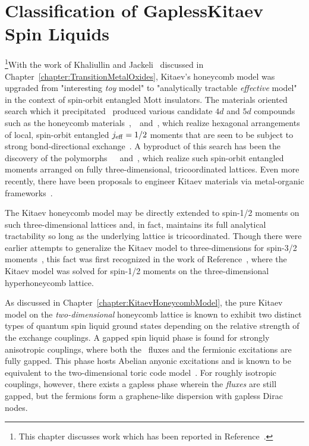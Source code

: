 \chapter[Classification of Gapless Kitaev Spin Liquids]{Classification of Gapless\linebreak Kitaev Spin Liquids}
\label{chapter:ClassificationOfKSL}
%
%
\footnote{This chapter discusses work which has been reported in Reference~\cite{OBrienPRB2016}.}With the work of Khaliullin and Jackeli~\cite{KhaliullinPTPS2005,JackeliPRL2009} discussed in Chapter~\ref{chapter:TransitionMetalOxides}, Kitaev's honeycomb model was upgraded from "interesting \textit{toy} model" to "analytically tractable \textit{effective} model" in the context of spin-orbit entangled Mott insulators.
The materials oriented search which it precipitated~\cite{SinghPRL2012,ChoiPRL2012,CominPRL2012,FengPRB2012,GretarssonPRL2013,GretarssonPRB2013,PlumbPRB2014,SandilandsPRL2015,KimPRB2015,MajumderPRB2015,SandilandsPRB2016,KubotaPRB2015,BanerjeeNatMat2016} produced various candidate $4d$ and $5d$ compounds such as the honeycomb materials~\sodiumIridate,~\alphaLithiumIridate~and~\ruthiniumTriChloride, which realize hexagonal arrangements of local, spin-orbit entangled $j_{\rm eff} = 1/2$ moments that are seen to be subject to strong bond-directional exchange~\cite{HwanChunNatPhys2015}.
A byproduct of this search has been the discovery of the polymorphs~\cite{TakayamaPRL2015, ModicNatComm2014}~\betaLithiumIridate~and~\gammaLithiumIridate, which realize such spin-orbit entangled moments arranged on fully three-dimensional, tricoordinated lattices.
Even more recently, there have been proposals to engineer Kitaev materials via metal-organic frameworks~\cite{MasahikoPRL2017}.

The Kitaev honeycomb model may be directly extended to spin-1/2 moments on such three-dimensional lattices and, in fact, maintains its full analytical tractability so long as the underlying lattice is tricoordinated.
Though there were earlier attempts to generalize the Kitaev model to three-dimensions for spin-3/2 moments~\cite{RyuPRB2009}, this fact was first recognized in the work of Reference~\cite{MandalPRB2009}, where the Kitaev model was solved for spin-1/2 moments on the three-dimensional hyperhoneycomb lattice.

As discussed in Chapter~\ref{chapter:KitaevHoneycombModel}, the pure Kitaev model on the \textit{two-dimensional} honeycomb lattice is known to exhibit two distinct types of quantum spin liquid ground states depending on the relative strength of the exchange couplings.
A gapped spin liquid phase is found for strongly anisotropic couplings, where both the \ZZ~fluxes and the fermionic excitations are fully gapped.
This phase hosts Abelian anyonic excitations and is known to be equivalent to the two-dimensional toric code model~\cite{KitaevAoP2003, KitaevAoP2006}.
For roughly isotropic couplings, however, there exists a gapless phase wherein the \textit{fluxes} are still gapped, but the fermions form a graphene-like dispersion with gapless Dirac nodes.

